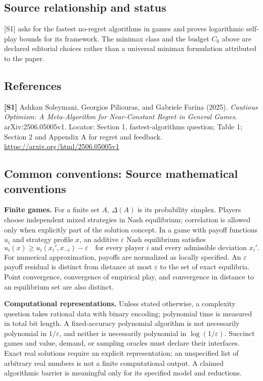 \documentclass[11pt,a4paper]{article}
\begin{document}
\subsection*{Source relationship and status}
[S1] asks for the fastest no-regret algorithms in games and proves logarithmic self-play bounds for its framework. The minimax class and the budget $C_0$ above are declared editorial choices rather than a universal minimax formulation attributed to the paper.
\subsection*{References}
\begingroup\footnotesize\raggedright
{\footnotesize\raggedright
\textbf{[S1]} Ashkan Soleymani, Georgios Piliouras, and Gabriele Farina (2025). \emph{Cautious Optimism: A Meta-Algorithm for Near-Constant Regret in General Games}. arXiv:2506.05005v1. Locator: Section 1, fastest-algorithms question; Table 1; Section 2 and Appendix A for regret and feedback. \url{https://arxiv.org/html/2506.05005v1}\par}
\par\endgroup

\subsection*{Common conventions: Source mathematical conventions}

\textbf{Finite games.} For a finite set $A$, $\Delta(A)$ is its probability
simplex. Players choose independent mixed strategies in Nash equilibrium;
correlation is allowed only when explicitly part of the solution concept.
In a game with payoff functions $u_i$ and strategy profile $x$, an additive
$\varepsilon$ Nash equilibrium satisfies
\[
 u_i(x)\geq u_i(x_i',x_{-i})-\varepsilon
 \quad\text{for every player $i$ and every admissible deviation $x_i'$}.
\]
For numerical approximation, payoffs are normalized as locally specified.
An $\varepsilon$ payoff residual is distinct from distance at most
$\varepsilon$ to the set of exact equilibria. Point convergence, convergence
of empirical play, and convergence in distance to an equilibrium set are
also distinct.

\textbf{Computational representations.} Unless stated otherwise, a complexity
question takes rational data with binary encoding; polynomial time is measured
in total bit length. A fixed-accuracy polynomial algorithm is not necessarily
polynomial in $1/\varepsilon$, and neither is necessarily polynomial in
$\log(1/\varepsilon)$. Succinct games and value, demand, or sampling oracles
must declare their interfaces. Exact real solutions require an explicit
representation; an unspecified list of arbitrary real numbers is not a
finite computational output. A claimed algorithmic barrier is meaningful
only for its specified model and reductions.
\end{document}
